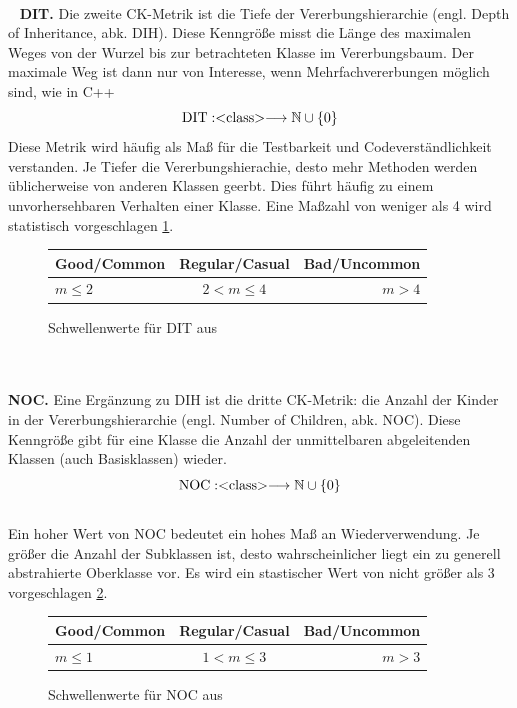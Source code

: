 \documentclass[12pt]{article}
\newcommand{\type}[1]{<\negthickspace\text{#1}\negthickspace> }
\begin{document}
~
\\~
\textbf{DIT.} Die zweite CK-Metrik ist die Tiefe der
Vererbungshierarchie (engl. Depth of Inheritance, abk. DIH).
Diese Kenngröße misst die Länge des maximalen Weges von der
Wurzel bis zur betrachteten Klasse im Vererbungsbaum. Der
maximale Weg ist dann nur von Interesse, wenn Mehrfachvererbungen
möglich sind, wie in C++
\[
        \text{DIT}: \type{class} 
        \longrightarrow \mathbb{N} \cup \left\{ 0 \right\} 
\]
Diese Metrik wird häufig als Maß für die Testbarkeit und
Codeverständlichkeit verstanden.  Je Tiefer die
Vererbungshierachie, desto mehr Methoden werden üblicherweise von
anderen Klassen geerbt. Dies führt häufig zu einem
unvorhersehbaren Verhalten einer Klasse. Eine Maßzahl von weniger
als 4 wird statistisch vorgeschlagen \ref{tab:ditthreshold}.
\begin{figure}[H]
\centering
 \begin{tabular}{lcr}
    \toprule
    Good/Common & Regular/Casual & Bad/Uncommon \\
    \midrule
    $m \leq 2$ & $2 < m \leq 4$ & $m > 4$ \\
    \bottomrule
  \end{tabular}
  \caption{Schwellenwerte für DIT aus \cite{Fil15}}
  \label{tab:ditthreshold}
\end{figure}
~\\
\\
\textbf{NOC.} Eine Ergänzung zu DIH ist die dritte CK-Metrik: die
Anzahl der Kinder in der Vererbungshierarchie (engl. Number of
Children, abk.  NOC). Diese Kenngröße gibt für eine Klasse die
Anzahl der unmittelbaren abgeleitenden Klassen (auch
Basisklassen) wieder.
\[
        \text{NOC}: \type{class} 
        \longrightarrow \mathbb{N} \cup \left\{ 0 \right\} 
\]\label{sec:NOC}
~\\
Ein hoher Wert von NOC bedeutet ein hohes Maß an
Wiederverwendung.  Je größer die Anzahl der Subklassen ist, desto
wahrscheinlicher liegt ein zu generell abstrahierte Oberklasse
vor. Es wird ein stastischer Wert von nicht größer als 3
vorgeschlagen \ref{tab:nocthreshold}.
\begin{figure}[H]
\centering
 \begin{tabular}{lcr}
    \toprule
    Good/Common & Regular/Casual & Bad/Uncommon \\
    \midrule
    $m \leq 1$ & $1 < m \leq 3$ & $m > 3$ \\
    \bottomrule
  \end{tabular}
  \caption{Schwellenwerte für NOC aus \cite{Fil15}}
  \label{tab:nocthreshold}
\end{figure}
\end{document}
